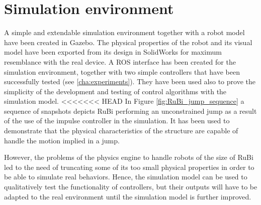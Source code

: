 \section{Simulation environment} %
\label{sec:simulation_environment}
A simple and extendable simulation environment together with a robot model have been created in Gazebo.
The physical properties of the robot and its visual model have been exported from its design in SolidWorks for maximum resemblance with the real device.
A ROS interface has been created for the simulation environment, together with two simple controllers that have been successfully tested (see \ref{cha:experiments}).
They have been used also to prove the simplicity of the development and testing of control algorithms with the simulation model.
<<<<<<< HEAD
In Figure \ref{fig:RuBi_jump_sequence} a sequence of snapshots depicts RuBi performing an unconstrained jump as a result of the use of the impulse controller in the simulation.
It has been used to demonstrate that the physical characteristics of the structure are capable of handle the motion implied in a jump. 

However, the problems of the physics engine to handle robots of the size of RuBi led to the need of truncating some of its too small physical properties in order to be able to simulate real behaviors.
Hence, the simulation model can be used to qualitatively test the functionality of controllers, but their outputs will have to be adapted to the real environment until the simulation model is further improved.

